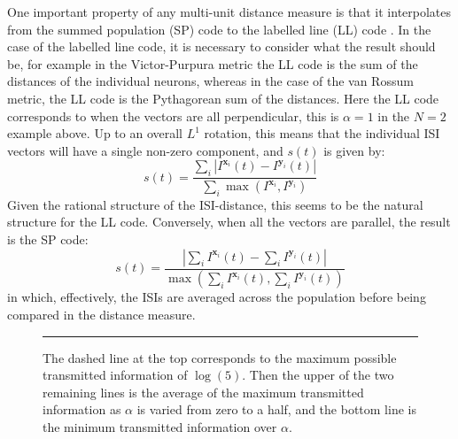 One important property of any multi-unit distance measure is that it interpolates from the summed population (SP) code  to the labelled line (LL) code .  In the case of the labelled line code, it is necessary to consider what the result should be, for example in the Victor-Purpura metric the LL code is the sum of the distances of the individual neurons, whereas in the case of the van Rossum metric, the LL code is the Pythagorean sum of the distances.  Here the LL code corresponds to when the vectors are all perpendicular,   this is $\alpha=1$ in the $N=2$ example above.  Up to an overall $L^1$ rotation, this means that the individual ISI vectors will have a single non-zero component, and $s(t)$ is given by:
\begin{equation}
s(t) = \frac{\sum_i | I^{\mathbf{x}_i} (t)  - I^{\mathbf{y}_i}(t)|}{\sum_i \max (I^{\mathbf{x}_i},I^{\mathbf{y}_i})}
 \end{equation}
 Given the rational structure of the ISI-distance, this seems to be the natural structure for the LL code.  
Conversely, when all the vectors are parallel, the result is the SP code:
\begin{equation}
s(t) = \frac{| \sum_i I^{\mathbf{x}_i}(t) - \sum_i I^{\mathbf{y}_i}(t) |}{\max (\sum_i I^{\mathbf{x}_i}(t),\sum_i I^{\mathbf{y}_i}(t) )}
\end{equation}
in which, effectively, the ISIs are averaged across the population before being compared in the distance measure.
%
%
\begin{figure}[htb]

\bigskip
\rule{31.5em}{0.5pt}
\caption{\label{mmav}The dashed line at the top corresponds to the maximum possible transmitted information of $\log(5)$.  Then the upper of the two remaining lines is the average of the maximum transmitted information as $\alpha$ is varied from zero to a half, and the bottom line is the minimum transmitted information over $\alpha$.}
\end{figure}

